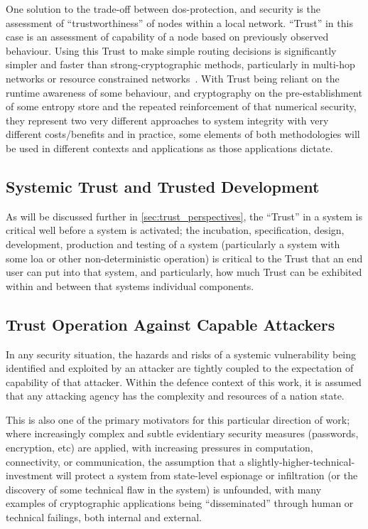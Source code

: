 One solution to the trade-off between \gls{dos}-protection, and security is the assessment of ``trustworthiness'' of nodes within a local network. 
``Trust'' in this case is an assessment of capability of a node based on previously observed behaviour.
Using this Trust to make simple routing decisions is significantly simpler and faster than strong-cryptographic methods, particularly in multi-hop networks or resource constrained networks~\cite{Cordasco2008}.
With Trust being reliant on the runtime awareness of some behaviour, and cryptography on the pre-establishment of some entropy store and the repeated reinforcement of that numerical security, they represent two very different approaches to system integrity with very different costs/benefits and in practice, some elements of both methodologies will be used in different contexts and applications as those applications dictate.

\subsection{Systemic Trust and Trusted Development}
As will be discussed further in \autoref{sec:trust_perspectives}, the ``Trust'' in a system is critical well before a system is activated; the incubation, specification, design, development, production and testing of a system (particularly a system with some \gls{loa} or other non-deterministic operation) is critical to the Trust that an end user can put into that system, and particularly, how much Trust can be exhibited within and between that systems individual components.

\subsection{Trust Operation Against Capable Attackers}\label{sec:capable_attackers}

In any security situation, the hazards and risks of a systemic vulnerability being identified and exploited by an attacker are tightly coupled to the expectation of capability of that attacker.
Within the defence context of this work, it is assumed that any attacking agency has the complexity and resources of a nation state.

This is also one of the primary motivators for this particular direction of work; where increasingly complex and subtle evidentiary security measures (passwords, encryption, etc) are applied, with increasing pressures in computation, connectivity, or communication, the assumption that a slightly-higher-technical-investment will protect a system from state-level espionage or infiltration (or the discovery of some technical flaw in the system) is unfounded, with many examples of cryptographic applications being ``disseminated'' through human or technical failings, both internal and external. 


